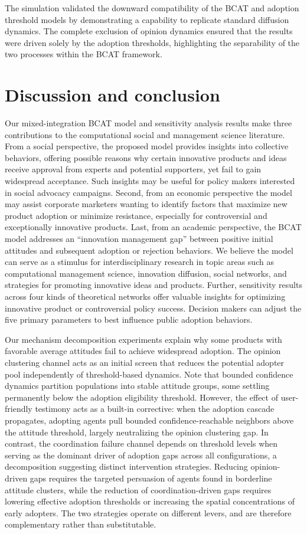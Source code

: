 \documentclass[10pt,letterpaper]{article}
\begin{document}
The simulation validated the downward compatibility of the BCAT and adoption threshold models by demonstrating a capability to replicate standard diffusion dynamics. The complete exclusion of opinion dynamics ensured that the results were driven solely by the adoption thresholds, highlighting the separability of the two processes within the BCAT framework.


\section*{Discussion and conclusion}

Our mixed-integration BCAT model and sensitivity analysis results make three contributions to the computational social and management science literature. From a social perspective, the proposed model provides insights into collective behaviors, offering possible reasons why certain innovative products and ideas receive approval from experts and potential supporters, yet fail to gain widespread acceptance. Such insights may be useful for policy makers interested in social advocacy campaigns. Second, from an economic perspective the model may assist corporate marketers wanting to identify factors that maximize new product adoption or minimize resistance, especially for controversial and exceptionally innovative products. Last, from an academic perspective, the BCAT model addresses an ``innovation management gap'' between positive initial attitudes and subsequent adoption or rejection behaviors. We believe the model can serve as a stimulus for interdisciplinary research in topic areas such as computational management science, innovation diffusion, social networks, and strategies for promoting innovative ideas and products. Further, sensitivity results across four kinds of theoretical networks offer valuable insights for optimizing innovative product or controversial policy success. Decision makers can adjust the five primary parameters to best influence public adoption behaviors.

Our mechanism decomposition experiments explain why some products with favorable average attitudes fail to achieve widespread adoption. The opinion clustering channel acts as an initial screen that reduces the potential adopter pool independently of threshold-based dynamics. Note that bounded confidence dynamics partition populations into stable attitude groups, some settling permanently below the adoption eligibility threshold. However, the effect of user-friendly testimony acts as a built-in corrective: when the adoption cascade propagates, adopting agents pull bounded confidence-reachable neighbors above the attitude threshold, largely neutralizing the opinion clustering gap. In contrast, the coordination failure channel depends on threshold levels when serving as the dominant driver of adoption gaps across all configurations, a decomposition suggesting distinct intervention strategies. Reducing opinion-driven gaps requires the targeted persuasion of agents found in borderline attitude clusters, while the reduction of coordination-driven gaps requires lowering effective adoption thresholds or increasing the spatial concentrations of early adopters. The two strategies operate on different levers, and are therefore complementary rather than substitutable.
\end{document}
